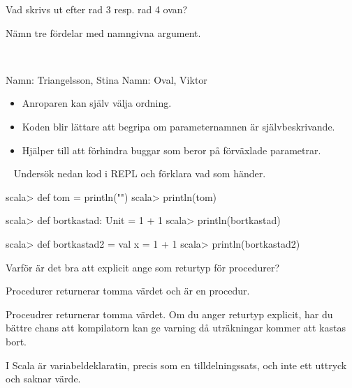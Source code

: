 \Subtask Vad skrivs ut efter rad 3 resp. rad 4 ovan?

\Subtask Nämn tre fördelar med namngivna argument.

\SOLUTION

\TaskSolved \what~

\SubtaskSolved
\begin{REPL}
Namn: Triangelsson, Stina
Namn: Oval, Viktor
\end{REPL}

\SubtaskSolved
\begin{itemize}
  \item Anroparen kan själv välja ordning.
  \item Koden blir lättare att begripa om parameternamnen är självbeskrivande.
  \item Hjälper till att förhindra buggar som beror på förväxlade parametrar.
\end{itemize}

\QUESTEND





\QUESTBEGIN

\Task  \what~ Undersök nedan kod i REPL och förklara vad som händer.

\Subtask
\begin{REPL}
scala> def tom = println("")
scala> println(tom)
\end{REPL}

\Subtask
\begin{REPL}
scala> def bortkastad: Unit = 1 + 1
scala> println(bortkastad)
\end{REPL}

\Subtask
\begin{REPL}
scala> def bortkastad2 = { val x = 1 + 1 }
scala> println(bortkastad2)
\end{REPL}

\Subtask Varför är det bra att explicit ange  som returtyp för procedurer?

\SOLUTION

\TaskSolved \what

\SubtaskSolved Procedurer returnerar tomma värdet och  är en procedur.

\SubtaskSolved Proceudrer returnerar tomma värdet. Om du anger returtyp  explicit, har du bättre chans att kompilatorn kan ge varning då uträkningar kommer att kastas bort.

\SubtaskSolved I Scala är variabeldeklaratin, precis som en tilldelningssats, och inte ett uttryck och saknar värde.

